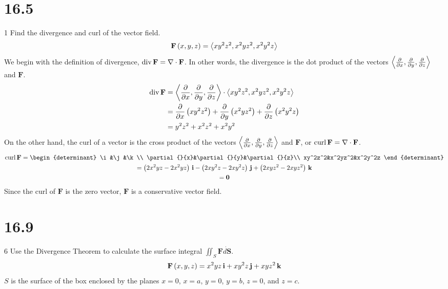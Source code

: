 \documentclass[12pt]{article}
\begin{document}
\section{16.5}{1}
Find the divergence and curl of the vector field.
%
\begin{equation*}
\mathbf{F}\paren{x,y,z}=\vector{xy^2z^2,x^2yz^2,x^2y^2z}
\end{equation*}
%
We begin with the definition of divergence, $\div\mathbf{F}=\nabla\dot\mathbf{F}$. In other words, the divergence is the dot
product of the vectors $\vector{\partial{}{x},\partial{}{y},\partial{}{z}}$ and $\mathbf{F}$.
%
\begin{align*}
\div\mathbf{F}&=\vector{\partial{}{x},\partial{}{y},\partial{}{z}}\dot\vector{xy^2z^2,x^2yz^2,x^2y^2z}\\
&=\partial{}{x}\paren{xy^2z^2}+\partial{}{y}\paren{x^2yz^2}+\partial{}{z}\paren{x^2y^2z}\\
&=y^2z^2+x^2z^2+x^2y^2
\end{align*}
%
On the other hand, the curl of a vector is the cross product of the
vectors $\vector{\partial{}{x},\partial{}{y},\partial{}{z}}$ and $\mathbf{F}$, or $\curl\mathbf{F}=\nabla\cross\mathbf{F}$.
%
\begin{gather*}
\curl\mathbf{F}=\begin{determinant}
\i&\j&\k\\
\partial{}{x}&\partial{}{y}&\partial{}{z}\\
xy^2z^2&x^2yz^2&x^2y^2z
\end{determinant}\\
=\paren{2x^2yz-2x^2yz}\i-\paren{2xy^2z-2xy^2z}\j+\paren{2xyz^2-2xyz^2}\k\\
=\mathbf{0}
\end{gather*}
%
Since the curl of $\mathbf{F}$ is the zero vector, $\mathbf{F}$ is a conservative vector field.

\section{16.9}{6}
Use the Divergence Theorem to calculate the surface integral $\iint_S{\mathbf{F}\dot{d\mathbf{S}}}$.
%
\begin{equation*}
\mathbf{F}\paren{x,y,z}=x^2yz\i+xy^2z\j+xyz^2\k
\end{equation*}
%
$S$ is the surface of the box enclosed by the planes $x=0$, $x=a$, $y=0$, $y=b$, $z=0$, and $z=c$.\double
\end{document}
